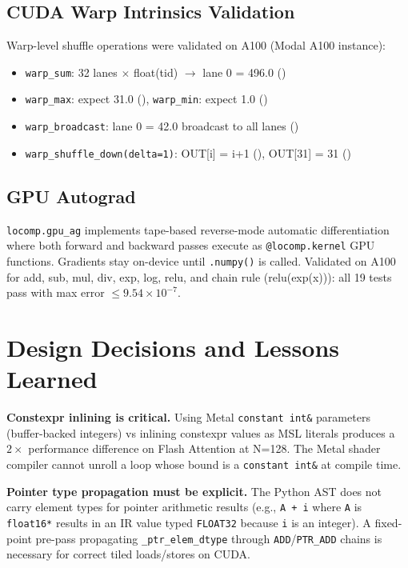 \documentclass[10pt,twocolumn]{article}
\begin{document}
\subsection{CUDA Warp Intrinsics Validation}

Warp-level shuffle operations were validated on A100 (Modal A100 instance):
\begin{itemize}[noitemsep]
  \item \texttt{warp\_sum}: 32 lanes $\times$ float(tid) $\to$ lane 0 = 496.0 (\checkmark)
  \item \texttt{warp\_max}: expect 31.0 (\checkmark), \texttt{warp\_min}: expect 1.0 (\checkmark)
  \item \texttt{warp\_broadcast}: lane 0 = 42.0 broadcast to all lanes (\checkmark)
  \item \texttt{warp\_shuffle\_down(delta=1)}: OUT[i] = i+1 (\checkmark), OUT[31] = 31 (\checkmark)
\end{itemize}

\subsection{GPU Autograd}

\texttt{locomp.gpu\_ag} implements tape-based reverse-mode automatic
differentiation where both forward and backward passes execute as
\texttt{@locomp.kernel} GPU functions. Gradients stay on-device until
\texttt{.numpy()} is called. Validated on A100 for add, sub, mul, div, exp,
log, relu, and chain rule (relu(exp(x))): all 19 tests pass with
max error $\leq 9.54 \times 10^{-7}$.

\section{Design Decisions and Lessons Learned}
\label{sec:lessons}

\textbf{Constexpr inlining is critical.} Using Metal \texttt{constant int\&}
parameters (buffer-backed integers) vs inlining constexpr values as MSL
literals produces a $2\times$ performance difference on Flash Attention at
N=128. The Metal shader compiler cannot unroll a loop whose bound is a
\texttt{constant int\&} at compile time.

\textbf{Pointer type propagation must be explicit.} The Python AST does not
carry element types for pointer arithmetic results (e.g., \texttt{A + i} where
\texttt{A} is \texttt{float16*} results in an IR value typed \texttt{FLOAT32}
because \texttt{i} is an integer). A fixed-point pre-pass propagating
\texttt{\_ptr\_elem\_dtype} through \texttt{ADD}/\texttt{PTR\_ADD} chains is
necessary for correct tiled loads/stores on CUDA.
\end{document}
